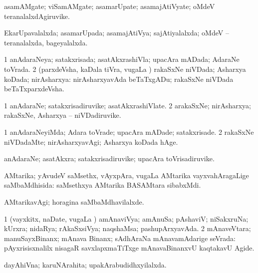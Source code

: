 \bentry
{}
\gl{\nA}
\bmng
asamAMgate; viSamAMgate; asamarUpate; asamajAtiVyate; oMdeV teranalalxdAgiruvike. 
\emng
\eentry

\bentry
{}
\gl{\gu}
\bmng
EkarUpavalalxda; asamarUpada; asamajAtiVya; sajAtiyalalxda; oMdeV -- teranalalxda, bageyalalxda. 
\emng
\eentry

\bentry
{}
\gl{\gu}
\bmng
\bnum
\num{1} anAdaraNeya; satakxrisada; asatAkxrashiVla; upacAra mADada; AdaraNe toVrada. 
\num{2} (parxdeVsha, kaDala tiVra, \mo vugaLa \vi) rakaSxNe niVDada; Asharxya koDada; nirAsharxya:  nirAsharxyavAda beTaTxgADu; rakaSxNe niVDada beTaTxparxdeVsha. 
\enum
\emng
\eentry

\bentry
{}
\gl{\nA}
\bmng
\bnum
\num{1} anAdaraNe; satakxrisadiruvike; asatAkxrashiVlate. 
\num{2} arakaSxNe; nirAsharxya; rakaSxNe, Asharxya -- niVDadiruvike. 
\enum
\emng
\eentry

\bentry
{}
\gl{\kirxvi}
\bmng
\bnum
\num{1} anAdaraNeyiMda; Adara toVrade; upacAra mADade; satakxrisade. 
\num{2} rakaSxNe niVDadaMte; nirAsharxyavAgi; Asharxya koDada hAge. 
\enum
\emng
\eentry

\bentry
{}
\gl{\nA}
\bmng
anAdaraNe; asatAkxra; satakxrisadiruvike; upacAra toVrisadiruvike. 
\emng
\eentry

\bentry
{}
\gl{\gu}
\bmng
AMtarika; yAvudeV saMsethx, vAyxpAra, \mo vugaLa AMtarika vayxvahAragaLige saMbaMdhisida:  saMsethxya AMtarika BASAMtara sibabxMdi. 
\emng
\eentry

\bentry
{}
\gl{\kirxvi}
\bmng
AMtarikavAgi; horagina saMbaMdhavilalxde. 
\emng
\eentry

\bentry
{}
\gl{\gu}
\bmng
\bnum
\num{1} (vayxkitx, naDate, \mo vugaLa \vi) amAnaviVya; amAnuSa; pAshaviV; niSakxruNa; kUrxra; nidaRya; rAkaSxsiVya; naqshaMsa; pashupArxyavAda. 
\num{2} mAnaveVtara; manuSayxBinanx; mAnava Binanx; sAdhAraNa mAnavamAdarige seVrada:  pAyxrisisxnalilx nisagaR savxlapxmaTiTxge mAnavaBinanxvU kaqtakavU Agide. 
\enum
\emng
\eentry

\bentry
{}
\gl{\gu}
\bmng
dayAhiVna; karuNArahita; upakArabudidhxyilalxda. 
\emng
\eentry

